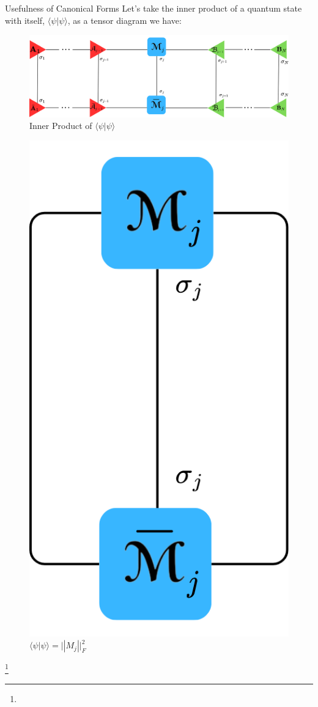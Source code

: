 \documentclass{beamer}
\newcommand\blfootnote[1]{%
  \begingroup
  \renewcommand\thefootnote{}\footnote{#1}%
  \addtocounter{footnote}{-1}%
  \endgroup
}
\begin{document}
\begin{frame}{Usefulness of Canonical Forms}
    \small
    Let's take the inner product of a quantum state with itself, $\langle\psi|\psi\rangle$, as a tensor diagram we have: \begin{figure}
        \centering
        \includegraphics[width=0.8\linewidth]{images/MPS Orthogonality/MPS_IP.png}
        \small \caption{\small Inner Product of $\langle\psi|\psi\rangle$}
        \label{fig:enter-label}
    \end{figure}
    \pause
        \begin{figure}
            \centering
            \includegraphics[scale = 0.116]{images/MPS Orthogonality/MPS_IP_2.png}
            \small\caption{\small $\langle \psi|\psi\rangle = ||M_j||^2_F$}
            \label{fig:enter-label}
        \end{figure}
    \blfootnote{}
\end{frame}
\end{document}
